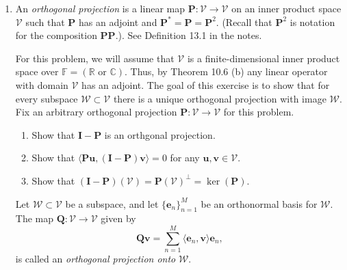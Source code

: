 \documentclass[12pt]{amsart}
\newcommand{\1}{\mathbbm{1}}
\newcounter{Theorem}
\newcounter{Definition}
\numberwithin{equation}{section}
\numberwithin{Theorem}{section}
\theoremstyle{plain} %
\theoremstyle{definition}
\theoremstyle{remark}
\begin{document}
\thispagestyle{empty}

\bigskip


\begin{enumerate}[1.]

\item An \textit{orthogonal projection} is a linear map \(\mathbf{P}:\mathcal{V}\to\mathcal{V}\) on an inner product space \(\mathcal{V}\) such that \(\mathbf{P}\) has an adjoint and \(\mathbf{P}^{\ast} = \mathbf{P} = \mathbf{P}^{2}\). (Recall that \(\mathbf{P}^{2}\) is notation for the composition \(\mathbf{PP}.\)). See Definition 13.1 in the notes.


\bigskip

\noindent For this problem, we will assume that \(\mathcal{V}\) is a finite-dimensional inner product space over \(\mathbb{F}=(\mathbb{R}\text{ or }\mathbb{C})\). Thus, by Theorem 10.6 (b) any linear operator with domain \(\mathcal{V}\) has an adjoint. The goal of this exercise is to show that for every subspace \(\mathcal{W}\subset\mathcal{V}\) there is a unique orthogonal projection with image \(\mathcal{W}\). Fix an arbitrary orthogonal projection \(\mathbf{P}:\mathcal{V}\to\mathcal{V}\) for this problem.\bigskip

\begin{enumerate}

\item Show that \(\mathbf{I}-\mathbf{P}\) is an orthgonal projection.\bigskip

\item Show that \(\langle \mathbf{Pu},(\mathbf{I}-\mathbf{P})\mathbf{v}\rangle = 0\) for any \(\mathbf{u},\mathbf{v}\in\mathcal{V}\).\bigskip

\item Show that \((\mathbf{I}-\mathbf{P})(\mathcal{V}) = \mathbf{P}(\mathcal{V})^{\bot} = \operatorname{ker}(\mathbf{P})\).\bigskip

\end{enumerate}

\noindent Let \(\mathcal{W}\subset\mathcal{V}\) be a subspace, and let \(\{\mathbf{e}_{n}\}_{n=1}^{M}\) be an orthonormal basis for \(\mathcal{W}\). The map \(\mathbf{Q}:\mathcal{V}\to\mathcal{V}\) given by
\[\mathbf{Qv} = \sum_{n=1}^{M}\langle \mathbf{e}_{n},\mathbf{v}\rangle\mathbf{e}_{n},\]
is called an \textit{orthogonal projection onto }\(\mathcal{W}\).\bigskip

\begin{enumerate}
\addtocounter{enumii}{3}


\end{enumerate}
\end{enumerate}
\end{document}
